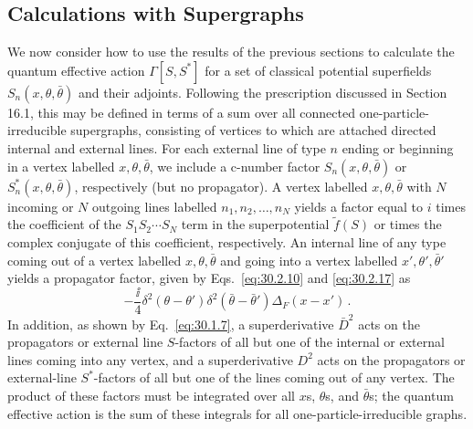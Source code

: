 
\subsection{Calculations with Supergraphs}

We now consider how to use the results of the previous sections to calculate
the quantum effective action \(\Gamma[S,S^*]\) for a set of classical
potential superfields \(S_n(x,\theta,\bar\theta)\) and their adjoints.
Following the
prescription discussed in Section 16.1, this may be defined in terms of a sum
over all connected one-particle-irreducible supergraphs, consisting of
vertices to which are attached directed internal and external lines. For each
external line of type \(n\) ending or beginning in a vertex labelled
\(x,\theta,\bar\theta\), we include a c-number factor
\(S_n(x,\theta,\bar\theta)\) or
\(S_n^*(x,\theta,\bar\theta)\), respectively (but no propagator).
A vertex labelled \(x,\theta,\bar\theta\) with \(N\) incoming or \(N\)
outgoing lines labelled
\(n_1,n_2,\ldots,n_N\) yields a factor equal to \(i\) times the coefficient
of the \(S_1S_2\cdots S_N\) term in the superpotential \(\widetilde f(S)\) or
times the complex conjugate of this coefficient, respectively. An internal
line of any type coming out of a vertex labelled \(x,\theta,\bar\theta\)
and going into a vertex labelled \(x',\theta',\bar\theta'\) yields a
propagator factor, given by
Eqs.~\eqref{eq:30.2.10} and \eqref{eq:30.2.17} as
\begin{equation}
  -\frac{\ii}{4}\delta^2(\theta-\theta')
    \delta^2(\bar\theta-\bar\theta')\Delta_F(x-x')\,.
  \tag{30.3.1}\label{eq:30.3.1}
\end{equation}
In addition, as shown by Eq.~\eqref{eq:30.1.7}, a superderivative
\(\bar D^2\) acts on the propagators or external line \(S\)-factors of all
but one of the internal or external lines coming into any vertex, and a
superderivative \(D^2\) acts on the propagators or external-line
\(S^*\)-factors of all but one of the lines coming out of any vertex.
The product of these factors must be integrated over all \(x\)s,
\(\theta\)s, and \(\bar\theta\)s;
the quantum effective action is the sum of these integrals for all
one-particle-irreducible graphs.

